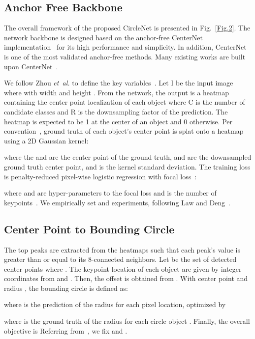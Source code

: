\documentclass[journal]{IEEEtran}
\newcommand{\Fig}{Fig.}
\begin{document}
\subsection{Anchor Free Backbone}
The overall framework of the proposed CircleNet is presented in \Fig ~\ref{Fig.2}. The network backbone is designed based on the anchor-free CenterNet implementation~\cite{zhou2019objects} for its high performance and simplicity. In addition, CenterNet is one of the most validated anchor-free methods. Many existing works are built upon CenterNet~\cite{peng2020deep, zhou2020tracking, li2020rtm3d}.

We follow Zhou \textit{et~al.} to define the key variables~\cite{zhou2019objects}. Let I be the input image where   with width  and height . From the network, the output is a heatmap  containing the center point localization of each object where C is the number of candidate classes and R is the downsampling factor of the prediction. The heatmap  is expected to be 1 at the center of an object and 0 otherwise. Per convention~\cite{law2018cornernet, zhou2019objects}, ground truth of each object's center point is splat onto a heatmap  using a 2D Gaussian kernel:

 

where the  and  are the center point of the ground truth,  and  are the downsampled ground truth center point, and  is the kernel standard deviation. The training loss is  penalty-reduced pixel-wise logistic regression with focal loss~\cite{lin2017focal}:



where  and  are hyper-parameters to the focal loss and  is the number of keypoints~\cite{lin2017focal}. We empirically set  and  experiments, following Law and Deng~\cite{law2018cornernet}.

\subsection{Center Point to Bounding Circle}
The top  peaks are extracted from the heatmaps such that each peak's value is greater than or equal to its 8-connected neighbors. Let  be the set of  detected center points where . The keypoint location of each object are given by integer coordinates  from  and . Then, the offset  is obtained from . With center point  and radius , the bounding circle is defined as:

where  is the prediction of the radius for each pixel location, optimized by 

where  is the ground truth of the radius for each circle object . Finally, the overall objective is
 Referring from~\cite{zhou2019objects}, we fix  and .
\end{document}
